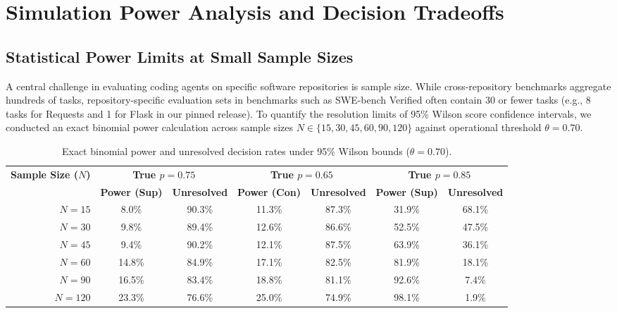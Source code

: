 \documentclass[runningheads]{llncs}
\begin{document}
\section{Simulation Power Analysis and Decision Tradeoffs}
\label{sec:results}

\subsection{Statistical Power Limits at Small Sample Sizes}
A central challenge in evaluating coding agents on specific software repositories is sample size. While cross-repository benchmarks aggregate hundreds of tasks, repository-specific evaluation sets in benchmarks such as SWE-bench Verified often contain 30 or fewer tasks (e.g., 8 tasks for Requests and 1 for Flask in our pinned release). To quantify the resolution limits of 95\% Wilson score confidence intervals, we conducted an exact binomial power calculation across sample sizes $N \in \{15, 30, 45, 60, 90, 120\}$ against operational threshold $\theta = 0.70$.

\begin{table}[t]
\caption{Exact binomial power and unresolved decision rates under 95\% Wilson bounds ($\theta = 0.70$).}
\label{tab:power_analysis}
\centering
\scriptsize
\setlength{\tabcolsep}{6pt}
\begin{tabular}{rcccccc}
\toprule
\textbf{Sample Size ($N$)} & \multicolumn{2}{c}{\textbf{True $p = 0.75$}} & \multicolumn{2}{c}{\textbf{True $p = 0.65$}} & \multicolumn{2}{c}{\textbf{True $p = 0.85$}} \\
\cmidrule(lr){2-3} \cmidrule(lr){4-5} \cmidrule(lr){6-7}
& \textbf{Power (Sup)} & \textbf{Unresolved} & \textbf{Power (Con)} & \textbf{Unresolved} & \textbf{Power (Sup)} & \textbf{Unresolved} \\
\midrule
$N = 15$ & 8.0\% & 90.3\% & 11.3\% & 87.3\% & 31.9\% & 68.1\% \\
$N = 30$ & 9.8\% & 89.4\% & 12.6\% & 86.6\% & 52.5\% & 47.5\% \\
$N = 45$ & 9.4\% & 90.2\% & 12.1\% & 87.5\% & 63.9\% & 36.1\% \\
$N = 60$ & 14.8\% & 84.9\% & 17.1\% & 82.5\% & 81.9\% & 18.1\% \\
$N = 90$ & 16.5\% & 83.4\% & 18.8\% & 81.1\% & 92.6\% & 7.4\% \\
$N = 120$ & 23.3\% & 76.6\% & 25.0\% & 74.9\% & 98.1\% & 1.9\% \\
\bottomrule
\end{tabular}
\end{table}
\end{document}
